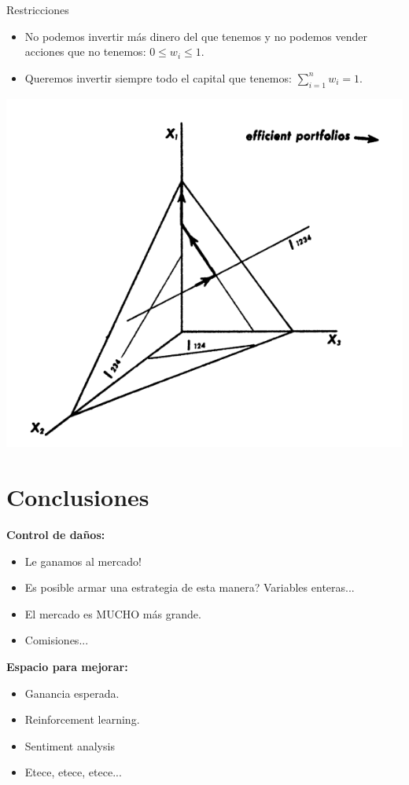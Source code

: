 \documentclass[12pt,aspectratio=169]{beamer}
\begin{document}
\begin{frame}{Restricciones}
	\begin{itemize}
	\item No podemos invertir más dinero del que tenemos y no podemos vender acciones que no tenemos: $0 \le w_i \le 1$.
	\item Queremos invertir siempre todo el capital que tenemos: $\sum_{i=1}^{n} w_i = 1$.
	\end{itemize}

\begin{center}
	\includegraphics[width=.3\paperwidth]{constraints.png}
\end{center}

\end{frame}


\section{Conclusiones}
\begin{frame}
\textbf{Control de daños:}

\begin{itemize}
\item Le ganamos al mercado!
\item Es posible armar una estrategia de esta manera? Variables enteras...
\item El mercado es MUCHO más grande.
\item Comisiones...
\end{itemize}

\textbf{Espacio para mejorar:}

\begin{itemize}
\item Ganancia esperada.
\item Reinforcement learning.
\item Sentiment analysis
\item Etece, etece, etece...
\end{itemize}
\end{frame}
\end{document}
